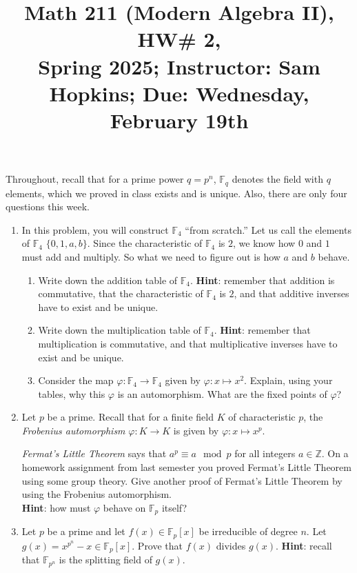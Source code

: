 \documentclass[11pt]{article}
\title{Math 211 (Modern Algebra II), HW\# 2, \\ {\normalsize Spring 2025; Instructor: Sam Hopkins; Due: Wednesday, February 19th}}
\date{}
\begin{document}
\maketitle

\thispagestyle{empty}

Throughout, recall that for a prime power $q=p^n$, $\mathbb{F}_q$ denotes the field with $q$ elements, which we proved in class exists and is unique. Also, there are only four questions this week.

\begin{enumerate}

\item In this problem, you will construct $\mathbb{F}_4$ ``from scratch.'' Let us call the elements of $\mathbb{F}_4$ $\{0,1,a,b\}$. Since the characteristic of $\mathbb{F}_4$ is $2$, we know how $0$ and $1$ must add and multiply. So what we need to figure out is how $a$ and $b$ behave.
\begin{enumerate}
\item Write down the addition table of $\mathbb{F}_4$. {\bf Hint}: remember that addition is commutative, that the characteristic of $\mathbb{F}_4$ is $2$, and that additive inverses have to exist and be unique.
\item Write down the multiplication table of $\mathbb{F}_4$. {\bf Hint}: remember that multiplication is commutative, and that multiplicative inverses have to exist and be unique.
\item Consider the map $\varphi\colon \mathbb{F}_4 \to \mathbb{F}_4$ given by $\varphi\colon x \mapsto x^2$. Explain, using your tables, why this $\varphi$ is an automorphism. What are the fixed points of $\varphi$?
\end{enumerate}

\item Let $p$ be a prime. Recall that for a finite field $K$ of characteristic $p$, the \emph{Frobenius automorphism} $\varphi\colon K \to K$ is given by $\varphi\colon x \mapsto x^p$.

\emph{Fermat's Little Theorem} says that $a^p \equiv a \mod p$ for all integers $a\in\mathbb{Z}$. On a homework assignment from last semester you proved Fermat's Little Theorem using some group theory. Give another proof of Fermat's Little Theorem by using the Frobenius automorphism. \\{\bf Hint}: how must $\varphi$ behave on $\mathbb{F}_p$ itself?

\item Let $p$ be a prime and let $f(x) \in \mathbb{F}_p[x]$ be irreducible of degree $n$. Let $g(x) = x^{p^n}-x\in \mathbb{F}_p[x]$. Prove that $f(x)$ divides $g(x)$. {\bf Hint}: recall that $\mathbb{F}_{p^n}$ is the splitting field of $g(x)$.


\end{enumerate}
\end{document}
